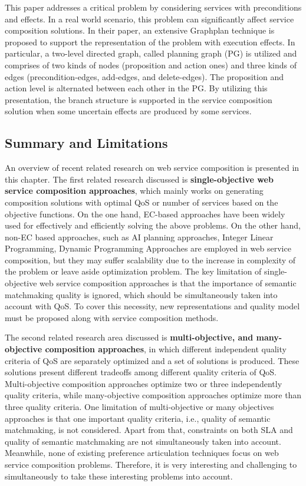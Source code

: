 This paper \cite{wang2016automatic}  addresses a critical problem by considering services with preconditions and effects. In a real world scenario, this problem can significantly affect service composition solutions.  In their paper, an extensive Graphplan technique is proposed to support the representation of the problem with execution effects. In particular, a two-level directed graph, called planning graph (PG) is utilized and comprises of two kinds of nodes (proposition and action ones) and three kinds of edges (precondition-edges, add-edges, and delete-edges). The proposition and action level is alternated between each other in the PG.  By utilizing this presentation, the branch structure is supported in the service composition solution when some uncertain effects are produced by some services. 

\subsection{Summary and Limitations}\label{summary}

An overview of recent related research on web service composition is presented in this chapter. The first related research discussed is \textbf{single-objective web service composition approaches}, which mainly works on generating composition solutions with optimal QoS or number of services based on the objective functions. On the one hand, EC-based approaches have been widely used for effectively and efficiently solving the above problems. On the other hand, non-EC based approaches, such as AI planning approaches, Integer Linear Programming, Dynamic Programming Approaches are employed in web service composition, but they may suffer scalability due to the increase in complexity of the problem or leave aside optimization problem. The key limitation of single-objective web service composition approaches is that the importance of semantic matchmaking quality is ignored, which should be simultaneously taken into account with QoS. To cover this necessity, new representations and quality model must be proposed along with service composition methods.

The second related research area discussed is \textbf{multi-objective, and many-objective composition approaches}, in which different independent quality criteria of QoS are separately optimized and a set of solutions is produced.  These solutions present different tradeoffs among different quality criteria of QoS. Multi-objective composition approaches optimize two or three independently quality criteria, while many-objective composition approaches optimize more than three quality criteria. One limitation of multi-objective or many objectives approaches is that one important quality criteria, i.e., quality of semantic matchmaking, is not considered. Apart from that,  constraints on both SLA and quality of semantic matchmaking are not simultaneously taken into account. Meanwhile, none of existing preference articulation techniques focus on web service composition problems. Therefore, it is very interesting and challenging to simultaneously to take these interesting problems into account.

